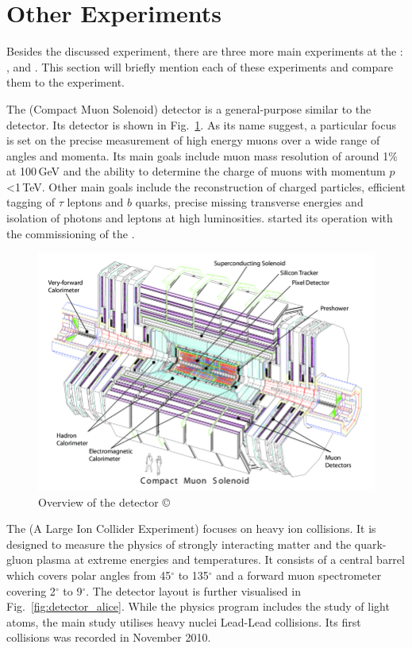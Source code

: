 \documentclass[bachelor,ngerman,english]{GAUBM}
\begin{document}
\section{Other Experiments}
\label{sec:exp:other_experiments}
Besides the discussed \atlas experiment, there are three more main experiments at the \lhc: \cms, \alice and \lhcb. This section will briefly mention each of these experiments and compare them to the \atlas experiment.

The \cms (Compact Muon Solenoid) \cite{other:cms} detector is a general-purpose similar to the \atlas detector. Its detector is shown in Fig.~\ref{fig:detector_cms}. As its name suggest, a particular focus is set on the precise measurement of high energy muons over a wide range of angles and momenta. Its main goals include muon mass resolution of around 1\% at 100\,GeV and the ability to determine the charge of muons with momentum $p$<1\,TeV. Other main goals include the reconstruction of charged particles, efficient tagging of $\tau$ leptons and $b$ quarks, precise missing transverse energies and isolation of photons and leptons at high luminosities. \cms started its operation with the commissioning of the \lhc.

\begin{figure}[t]
    \centering
    \includegraphics[width=.8\textwidth]{figures/lhc/detector_cms.png}
    \caption{Overview of the \cms detector \copyright{\cern}}
    \label{fig:detector_cms}
\end{figure}

The \alice (A Large Ion Collider Experiment) \cite{other:alice} focuses on heavy ion collisions. It is designed to measure the physics of strongly interacting matter and the quark-gluon plasma at extreme energies and temperatures. It consists of a central barrel which covers polar angles from 45$^\circ$ to 135$^\circ$ and a forward muon spectrometer covering 2$^\circ$ to 9$^\circ$. The detector layout is further visualised in Fig.~\ref{fig:detector_alice}. While the \alice physics program includes the study of light atoms, the main study utilises heavy nuclei Lead-Lead collisions. Its first collisions was recorded in November 2010.
\end{document}
